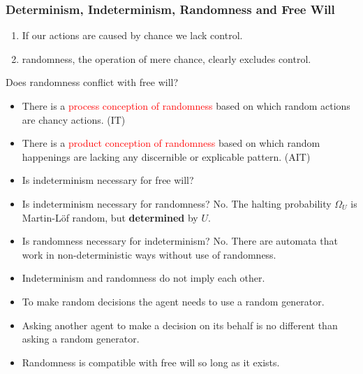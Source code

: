 \documentclass[UTF8,11pt,colorlinks,compress,openany]{beamer}%
\begin{document}
\begin{frame}\frametitle{Determinism, Indeterminism, Randomness and Free Will}
\begin{enumerate}
	\item If our actions are caused by chance we lack control.
	\item randomness, the operation of mere chance, clearly excludes control.
\end{enumerate}
Does randomness conflict with free will?
\begin{itemize}
	\item There is a \textcolor{red}{process conception of randomness} based on which random actions are chancy actions. (IT)
	\item There is a \textcolor{red}{product conception of randomness} based on which random happenings are lacking any discernible or explicable pattern. (AIT)
\end{itemize}
\begin{itemize}
	\item Is indeterminism necessary for free will?
	\item Is indeterminism necessary for randomness? No. The halting probability $\Omega_U$ is Martin-L\"of random, but \textbf{determined} by $U$.
	\item Is randomness necessary for indeterminism? No. There are automata that work in non-deterministic ways without use of randomness.
	\item Indeterminism and randomness do not imply each other.
	\item To make random decisions the agent needs to use a random generator.
	\item Asking another agent to make a decision on its behalf is no different than asking a random generator.
	\item Randomness is compatible with free will so long as it exists.
\end{itemize}
\end{frame}
\end{document}
